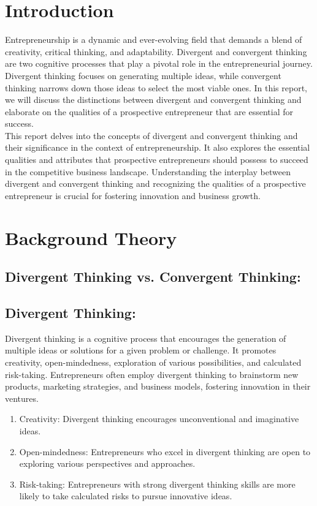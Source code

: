 \documentclass[12pt]{report}
\begin{document}
\newpage
\section*{Introduction}
Entrepreneurship is a dynamic and ever-evolving field that demands a blend of creativity, critical thinking, and adaptability. Divergent and convergent thinking are two cognitive processes that play a pivotal role in the entrepreneurial journey. Divergent thinking focuses on generating multiple ideas, while convergent thinking narrows down those ideas to select the most viable ones. In this report, we will discuss the distinctions between divergent and convergent thinking and elaborate on the qualities of a prospective entrepreneur that are essential for success.\\


This report delves into the concepts of divergent and convergent thinking and their significance in the context of entrepreneurship. It also explores the essential qualities and attributes that prospective entrepreneurs should possess to succeed in the competitive business landscape. Understanding the interplay between divergent and convergent thinking and recognizing the qualities of a prospective entrepreneur is crucial for fostering innovation and business growth.\cite{entrepreneurship}



\newpage
\section*{Background Theory}
\subsection*{Divergent Thinking vs. Convergent Thinking:}

\subsection*{Divergent Thinking:} Divergent thinking is a cognitive process that encourages the generation of multiple ideas or solutions for a given problem or challenge. It promotes creativity, open-mindedness, exploration of various possibilities, and calculated risk-taking. Entrepreneurs often employ divergent thinking to brainstorm new products, marketing strategies, and business models, fostering innovation in their ventures.\cite{divergent}
\begin{enumerate}
    \item Creativity: Divergent thinking encourages unconventional and imaginative ideas.
    \item Open-mindedness: Entrepreneurs who excel in divergent thinking are open to exploring various perspectives and approaches.
    \item Risk-taking:  Entrepreneurs with strong divergent thinking skills are more likely to take calculated risks to pursue innovative ideas.
\end{enumerate}
\end{document}
